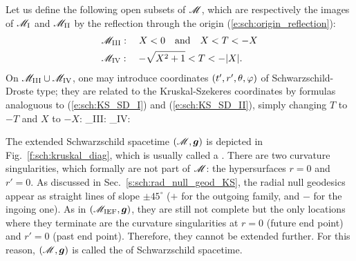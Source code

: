Let us define the following open subsets of $\mathscr{M}$, which are respectively
the images of $\mathscr{M}_{\rm I}$ and $\mathscr{M}_{\rm II}$ by the reflection through the origin
(\ref{e:sch:origin_reflection}):
\begin{subequations}
\begin{align}
 & \mathscr{M}_{\rm III}: \quad X < 0 \quad\mbox{and}\quad X < T < -X \\
 & \mathscr{M}_{\rm IV}: \quad - \sqrt{X^2+1} < T < -|X| .
\end{align}
\end{subequations}
On $\mathscr{M}_{\rm III}\cup \mathscr{M}_{\rm IV}$, one may introduce coordinates
$(t',r',\theta,\varphi)$ of Schwarzschild-Droste type; they are related to
the Kruskal-Szekeres coordinates by formulas analoguous to
(\ref{e:sch:KS_SD_I}) and (\ref{e:sch:KS_SD_II}), simply changing $T$ to $-T$
and $X$ to $-X$:
\be \label{e:sch:KS_SD_III}
    \M_{\rm III}: \quad {}
    \iff
\ee
\be \label{e:sch:KS_SD_IV}
    \M_{\rm IV}: \quad {}
    \iff
\ee

The extended Schwarzschild spacetime $(\mathscr{M},\bm{g})$ is depicted in
Fig.~\ref{f:sch:kruskal_diag}, which is usually called a
.
There are two curvature singularities, which formally are not part of $\mathscr{M}$:
the hypersurfaces $r=0$ and $r'=0$.
As discussed in Sec.~\ref{s:sch:rad_null_geod_KS}, the radial null
geodesics appear as straight lines of slope $\pm 45^\circ$ ($+$ for the
outgoing family, and $-$ for the ingoing one).
As in $(\mathscr{M}_{\rm IEF},\bm{g})$, they are still not complete but the only
locations where they terminate are the curvature singularities
at $r=0$ (future end point) and $r'=0$ (past end point). Therefore, they cannot
be extended further. For this reason, $(\mathscr{M},\bm{g})$ is called the
of Schwarzschild spacetime.

